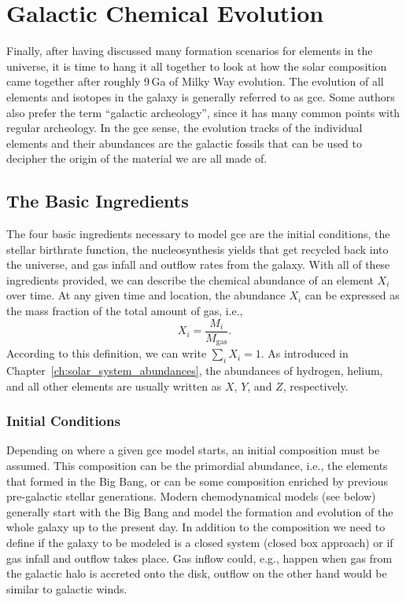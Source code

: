 
\chapter{Galactic Chemical Evolution}

Finally, after having discussed many formation scenarios for elements in the universe, it is time to hang it all together to look at how the solar composition came together after roughly 9\,Ga of Milky Way evolution. The evolution of all elements and isotopes in the galaxy is generally referred to as \acf{gce}. Some authors also prefer the term ``galactic archeology'', since it has many common points with regular archeology. In the \ac{gce} sense, the evolution tracks of the individual elements and their abundances are the galactic fossils that can be used to decipher the origin of the material we are all made of.

\section{The Basic Ingredients}

The four basic ingredients necessary to model \ac{gce} are the initial conditions, the stellar birthrate function, the nucleosynthesis yields that get recycled back into the universe, and gas infall and outflow rates from the galaxy. With all of these ingredients provided, we can describe the chemical abundance of an element $X_i$ over time. At any given time and location, the abundance $X_i$ can be expressed as the mass fraction of the total amount of gas, i.e.,
\begin{equation}
    X_i = \frac{M_i}{M_\mathrm{gas}}.
\end{equation}
According to this definition, we can write $\sum_i X_i = 1$. As introduced in Chapter~\ref{ch:solar_system_abundances}, the abundances of hydrogen, helium, and all other elements are usually written as $X$, $Y$, and $Z$, respectively.

\subsection{Initial Conditions}

Depending on where a given \ac{gce} model starts, an initial composition must be assumed. This composition can be the primordial abundance, i.e., the elements that formed in the Big Bang, or can be some composition enriched by previous pre-galactic stellar generations. Modern chemodynamical models (see below) generally start with the Big Bang and model the formation and evolution of the whole galaxy up to the present day. In addition to the composition we need to define if the galaxy to be modeled is a closed system (closed box approach) or if gas infall and outflow takes place. Gas inflow could, e.g., happen when gas from the galactic halo is accreted onto the disk, outflow on the other hand would be similar to galactic winds.


